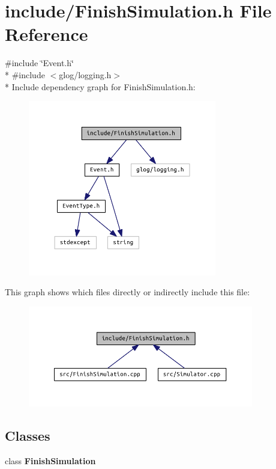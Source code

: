 \section{include/\+Finish\+Simulation.h File Reference}
\label{_finish_simulation_8h}
{\ttfamily \#include \char`\"{}Event.\+h\char`\"{}}\\*
{\ttfamily \#include $<$glog/logging.\+h$>$}\\*
Include dependency graph for Finish\+Simulation.\+h\+:\nopagebreak
\begin{figure}[H]
\begin{center}
\leavevmode
\includegraphics[width=233pt]{_finish_simulation_8h__incl}
\end{center}
\end{figure}
This graph shows which files directly or indirectly include this file\+:\nopagebreak
\begin{figure}[H]
\begin{center}
\leavevmode
\includegraphics[width=279pt]{_finish_simulation_8h__dep__incl}
\end{center}
\end{figure}
\subsection*{Classes}
\begin{DoxyCompactItemize}
\item 
class {\bf Finish\+Simulation}
\end{DoxyCompactItemize}
